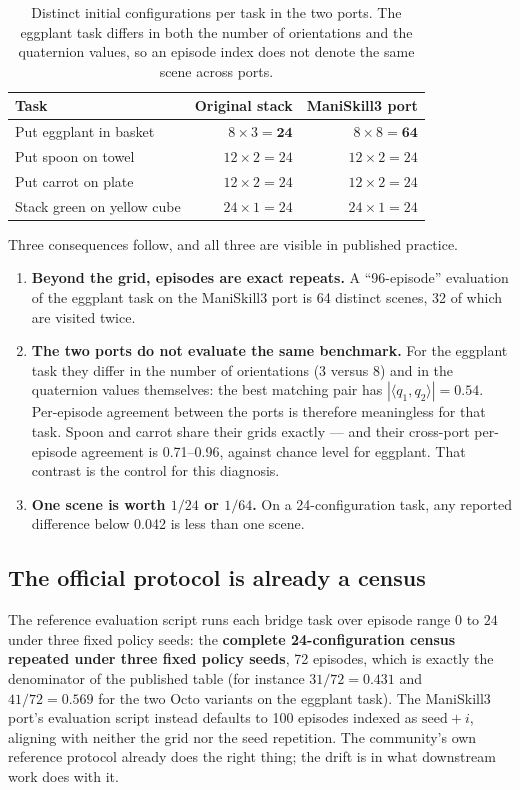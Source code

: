 \documentclass[pdflatex,iicol,sn-apa]{sn-jnl}
\theoremstyle{remark}
\begin{document}
\begin{table}[t]
\caption{Distinct initial configurations per task in the two ports. The eggplant task differs in both
the number of orientations and the quaternion values, so an episode index does not denote the same
scene across ports.}\label{tab2}
\begin{tabular}{@{}lrr@{}}
\toprule
Task & Original stack & ManiSkill3 port \\
\midrule
Put eggplant in basket & $8 \times 3 = \mathbf{24}$ & $8 \times 8 = \mathbf{64}$ \\
Put spoon on towel & $12 \times 2 = 24$ & $12 \times 2 = 24$ \\
Put carrot on plate & $12 \times 2 = 24$ & $12 \times 2 = 24$ \\
Stack green on yellow cube & $24 \times 1 = 24$ & $24 \times 1 = 24$ \\
\bottomrule
\end{tabular}
\end{table}

Three consequences follow, and all three are visible in published practice.

\begin{enumerate}
\item \textbf{Beyond the grid, episodes are exact repeats.} A ``96-episode'' evaluation of the
eggplant task on the ManiSkill3 port is 64 distinct scenes, 32 of which are visited twice.
\item \textbf{The two ports do not evaluate the same benchmark.} For the eggplant task they differ
in the number of orientations (3 versus 8) and in the quaternion values themselves: the best matching
pair has $|\langle q_1, q_2 \rangle| = 0.54$. Per-episode agreement between the ports is therefore
meaningless for that task. Spoon and carrot share their grids exactly --- and their cross-port
per-episode agreement is 0.71--0.96, against chance level for eggplant. That contrast is the control
for this diagnosis.
\item \textbf{One scene is worth $1/24$ or $1/64$.} On a 24-configuration task, any reported
difference below 0.042 is less than one scene.
\end{enumerate}

\subsection{The official protocol is already a census}\label{subsec5_2}

The reference evaluation script runs each bridge task over episode range $0$ to $24$ under three
fixed policy seeds: the \textbf{complete 24-configuration census repeated under three fixed policy
seeds}, 72 episodes, which is exactly the denominator of the published table (for instance $31/72 =
0.431$ and $41/72 = 0.569$ for the two Octo variants on the eggplant task). The ManiSkill3 port's
evaluation script instead defaults to 100 episodes indexed as $\mathrm{seed} + i$, aligning with
neither the grid nor the seed repetition. The community's own reference protocol already does the
right thing; the drift is in what downstream work does with it.
\end{document}
